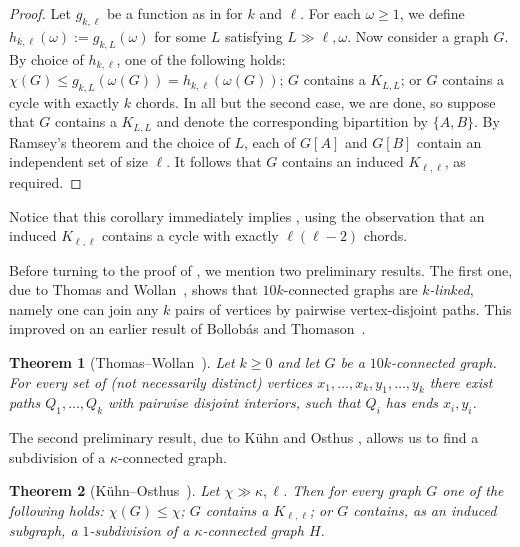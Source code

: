 \documentclass[11pt,english]{article}
\theoremstyle{plain}
\newtheorem{thm}{Theorem}[section]
\theoremstyle{definition}
\theoremstyle{remark}
\begin{document}
	\begin{proof}
	    Let $g_{k, \ell}$ be a function as in  for $k$ and $\ell$. For each $\omega \ge 1$, we define $h_{k, \ell}(\omega) := g_{k, L}(\omega)$ for some $L$ satisfying $L \gg \ell, \omega$. Now consider a graph $G$. By choice of $h_{k, \ell}$, one of the following holds: $\chi(G) \le g_{k, L}(\omega(G)) = h_{k, \ell}(\omega(G))$; $G$ contains a $K_{L, L}$; or $G$ contains a cycle with exactly $k$ chords. In all but the second case, we are done, so suppose that $G$ contains a $K_{L, L}$ and denote the corresponding bipartition by $\{A, B\}$. By Ramsey's theorem and the choice of $L$, each of $G[A]$ and $G[B]$ contain an independent set of size $\ell$. It follows that $G$ contains an induced $K_{\ell, \ell}$, as required. 
	\end{proof}
	
	Notice that this corollary immediately implies , using the observation that an induced $K_{\ell, \ell}$ contains a cycle with exactly $\ell(\ell - 2)$ chords.
	
	Before turning to the proof of , we mention two preliminary results.
	The first one, due to Thomas and Wollan~\cite{thomas-wollan}, shows that $10k$-connected graphs are \emph{$k$-linked}, namely one can join any $k$ pairs of vertices by pairwise vertex-disjoint paths. This improved on an earlier result of Bollob\'as and Thomason~\cite{bollobas1996highly}.

    \begin{thm}[Thomas--Wollan~\cite{thomas-wollan}] \label{thm:linkage}
		Let $k \ge 0$ and let $G$ be a $10k$-connected graph. For every set of (not necessarily distinct) vertices $x_1, \ldots, x_k, y_1, \ldots, y_k$ there exist paths $Q_1, \ldots, Q_k$ with pairwise disjoint interiors, such that $Q_i$ has ends $x_i, y_i$.
	\end{thm}

    The second preliminary result, due to K\"uhn and Osthus \cite{kuhn2004induced}, allows us to find a subdivision of a $\kappa$-connected graph.
    
	\begin{thm}[K\"uhn--Osthus~\cite{kuhn2004induced}] \label{thm:ko}
	    Let $\chi \gg \kappa, \ell$. 
	    Then for every graph $G$ one of the following holds: $\chi(G) \le \chi$; $G$ contains a $K_{\ell, \ell}$; or $G$ contains, as an induced subgraph, a $1$-subdivision of a $\kappa$-connected graph $H$.
	\end{thm}
	
\end{document}
